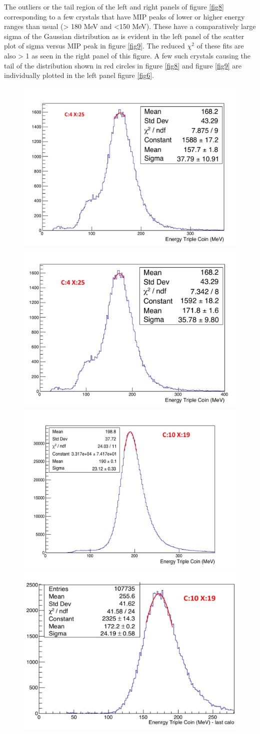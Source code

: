 \documentclass[article,accept,moreauthors,pdftex,10pt,a4paper]{../MDPI_template/Definitions/mdpi}
\begin{document}
The outliers or the tail region of the left and right panels of figure \ref{fig8} corresponding to a few crystals 
that have MIP peaks of lower or higher energy ranges than usual (> 180 MeV and <150 MeV). These have a 
comparatively large sigma of the Gaussian distribution as is evident in the left 
panel of the scatter plot of sigma versus MIP peak in figure \ref{fig9}. 
The reduced $\chi^2$ of these fits are also > 1 as seen in the right panel of this figure.  
A few such crystals causing the tail of the distribution shown in red circles in figure \ref{fig8} and figure \ref{fig9} 
are individually plotted in the left panel figure \ref{fig6}. 
\begin{figure}[H]%
\centering
\includegraphics[width=7 cm]{c4_x25.pdf}%
\includegraphics[width=7 cm]{c4_x25_after.pdf}\\%
\includegraphics[width=7 cm]{c10_x19.pdf}%
\includegraphics[width=7 cm]{c10_x19_after.pdf}\\%

\end{figure}
\end{document}
